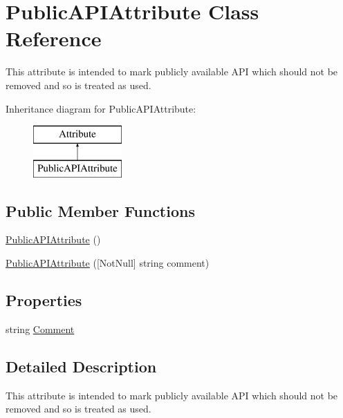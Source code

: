 \hypertarget{class_public_a_p_i_attribute}{}\section{Public\+A\+P\+I\+Attribute Class Reference}
\label{class_public_a_p_i_attribute}


This attribute is intended to mark publicly available A\+P\+I which should not be removed and so is treated as used.  


Inheritance diagram for Public\+A\+P\+I\+Attribute\+:\begin{figure}[H]
\begin{center}
\leavevmode
\includegraphics[height=2.000000cm]{class_public_a_p_i_attribute}
\end{center}
\end{figure}
\subsection*{Public Member Functions}
\begin{DoxyCompactItemize}
\item 
\hyperlink{class_public_a_p_i_attribute_a16e001e17bbe24c0a42b305d6a96e915}{Public\+A\+P\+I\+Attribute} ()
\item 
\hyperlink{class_public_a_p_i_attribute_ab00ffb9ccf468541a8f81f85fdee678a}{Public\+A\+P\+I\+Attribute} (\mbox{[}Not\+Null\mbox{]} string comment)
\end{DoxyCompactItemize}
\subsection*{Properties}
\begin{DoxyCompactItemize}
\item 
string \hyperlink{class_public_a_p_i_attribute_a4488351c8b5d0090c2bf8d69380acf6a}{Comment}
\end{DoxyCompactItemize}


\subsection{Detailed Description}
This attribute is intended to mark publicly available A\+P\+I which should not be removed and so is treated as used. 



